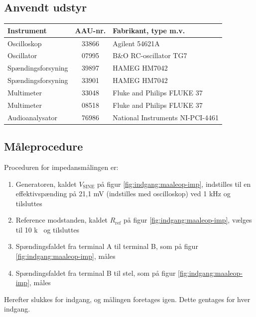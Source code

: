 \subsection*{Anvendt udstyr}
\label{indgang:maalejournal_anvendtudstyr}

\begin{table}[h]
\centering
\begin{tabular}{l|c|l}
\hline\hline
Instrument & AAU-nr. & Fabrikant, type m.v. \\
\hline\hline
Oscilloskop & 33866 & Agilent 54621A \\[4pt]
Oscillator & 07995 & B\&O RC-oscillator TG7 \\[4pt]
Spændingsforsyning & 39897 & HAMEG HM7042 \\[4pt]
Spændingsforsyning & 33901 & HAMEG HM7042 \\[4pt]
Multimeter & 33048 & Fluke and Philips FLUKE 37 \\[4pt]
Multimeter & 08518 & Fluke and Philips FLUKE 37 \\[4pt]
Audioanalysator & 76986 & National Instruments NI-PCI-4461 \\
\hline\hline
\end{tabular}
\label{tab:indgang:maaleudstyr_forforstaerker}
\end{table}

\subsection*{Måleprocedure}
\label{indgang:maalejournal_maaleprocedure}
Proceduren for impedansmålingen er:

\begin{enumerate}
\item Generatoren, kaldet $V_\mathrm{SINE}$ på figur \ref{fig:indgang:maaleop-imp}, indstilles til en effektivspænding på 21,1 mV (indstilles med oscilloskop) ved 1 kHz og tilsluttes
\item Reference modstanden, kaldet $R_\mathrm{ref}$ på figur \ref{fig:indgang:maaleop-imp}, vælges til 10 k\ohm~ og tilsluttes
\item Spændingsfaldet fra terminal A til terminal B, som på figur \ref{fig:indgang:maaleop-imp}, måles
\item Spændingsfaldet fra terminal B til stel, som på figur \ref{fig:indgang:maaleop-imp}, måles
\end{enumerate}
Herefter slukkes for indgang, og målingen foretages igen. Dette gentages for hver indgang.

